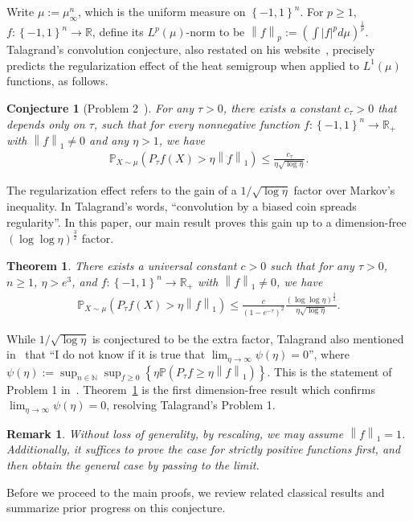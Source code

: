 \documentclass[11pt]{article}
\theoremstyle{named}
\theoremstyle{plain}
\newtheorem{theorem}{Theorem}
\newtheorem{conjecture}{Conjecture}
\newtheorem{remark}{Remark}
\newcommand{\defn}{:=}
\newcommand{\real}{\ensuremath{\mathbb{R}}}
\newcommand{\naturalnum}{\ensuremath{\mathbb{N}}}
\newcommand{\Prob}{\ensuremath{{\mathbb{P}}}}
\newcommand{\parenth}[1]{\left( #1 \right)}
\newcommand{\braces}[1]{\left\{ #1 \right \}}
\newcommand{\abss}[1]{\left| #1 \right |}
\newcommand{\vecnorm}[2]{\left\| #1\right\|_{#2}}
\begin{document}
Write $\mu \defn \mu_\infty^n$, which is the uniform measure on $\braces{-1, 1}^n$. For $p \geq 1$, $f: \braces{-1, 1}^n \to \real$, define its $L^p(\mu)$-norm to be $\vecnorm{f}{p} \defn \parenth{ \int \abss{f}^p d\mu }^{\frac{1}{p}}$. Talagrand's convolution conjecture, also restated on his website~\cite{talagrand1989prizes}, precisely predicts the regularization effect of the heat semigroup when applied to $L^1(\mu)$ functions, as follows. 
\begin{conjecture}[Problem 2~\cite{talagrand1989conjecture}]
  \label{conj:talagrand}
  For any $\tau > 0$, there exists a constant $c_\tau > 0$ that depends only on $\tau$, such that for every nonnegative function $f: \braces{-1, 1}^n \to \real_+$ with $\vecnorm{f}{1} \neq 0$ and any $\eta > 1$, we have 
  \begin{align*}
    \Prob_{X \sim \mu}(P_\tau f(X) > \eta \vecnorm{f}{1} ) \leq \frac{c_\tau}{\eta \sqrt{\log \eta}}.
  \end{align*}
\end{conjecture}
The regularization effect refers to the gain of a $1/\sqrt{\log \eta}$ factor over Markov's inequality. In Talagrand's words, ``convolution by a biased coin spreads regularity''. In this paper, our main result proves this gain up to a dimension-free $\parenth{\log \log \eta}^{\frac32}$ factor. 

\begin{theorem}
  \label{thm:main}
  There exists a universal constant $c > 0$ such that for any $\tau > 0$, $n \geq 1$, $\eta > e^3$, and $f: \braces{-1, 1}^n \to \real_+$ with $\vecnorm{f}{1} \neq 0$, we have 
  \begin{align*}
    \Prob_{X \sim \mu}(P_\tau f(X) > \eta \vecnorm{f}{1} ) \leq \frac{c}{\parenth{1-e^{-\tau}}^2} \frac{\parenth{ \log \log \eta}^{\frac32} }{\eta \sqrt{\log \eta}}.
  \end{align*}
\end{theorem}
While $1/\sqrt{\log \eta}$ is conjectured to be the extra factor, Talagrand also mentioned in~\cite{talagrand1989prizes} that ``I do not know if it is true that $\lim_{\eta \to \infty} \psi(\eta) = 0$'', where $\psi(\eta) \defn \sup_{n \in \naturalnum} \sup_{f \geq 0} \braces{\eta \Prob(P_\tau f \geq \eta \vecnorm{f}{1})}$. This is the statement of Problem 1 in~\cite{talagrand1989conjecture}. Theorem~\ref{thm:main} is the first dimension-free result which confirms $\lim_{\eta \to \infty} \psi(\eta) = 0$, resolving Talagrand's Problem 1. 

\begin{remark}
    \label{re:thm_main}
    Without loss of generality, by rescaling, we may assume $\vecnorm{f}{1} = 1$. Additionally, it suffices to prove the case for strictly positive functions first, and then obtain the general case by passing to the limit.
\end{remark}
Before we proceed to the main proofs, we review related classical results and summarize prior progress on this conjecture. 
\end{document}
